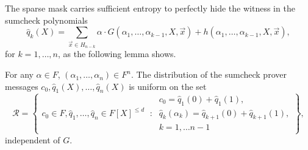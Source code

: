 %
The sparse mask carries sufficient entropy to perfectly hide the witness in the sumcheck polynomials
\begin{equation*}
\hat q_k(X) = \sum_{\vec x\in H_{n-k}} \alpha\cdot G(\alpha_1,\ldots, \alpha_{k-1},X,\vec x) +  h(\alpha_1,\ldots, \alpha_{k-1},X,\vec x),
\end{equation*}
for $k=1,\ldots,n$, as the following lemma shows.

\begin{lem}
For any $\alpha\in F $, $(\alpha_1,\ldots, \alpha_n)\in F^n$. 
The distribution of the sumcheck prover messages $c_0, \hat q_1(X),\ldots, \hat q_n(X)$ is uniform on the set
\[
\mathcal R = \left\{
\begin{matrix}
c_0\in F, \hat q_1,\ldots,\hat q_n\in F[X]^{\leq d}
\end{matrix}
\::\:
\begin{matrix}
c_0 = \hat q_1(0) + \hat q_1(1),
\\
\hat q_{k}(\alpha_{k}) = \hat q_{k+1}(0) + \hat q_{k+1}(1),
\\
k=1,\ldots n-1
\end{matrix}
\right\},
\]
independent of $G$.
\end{lem}

